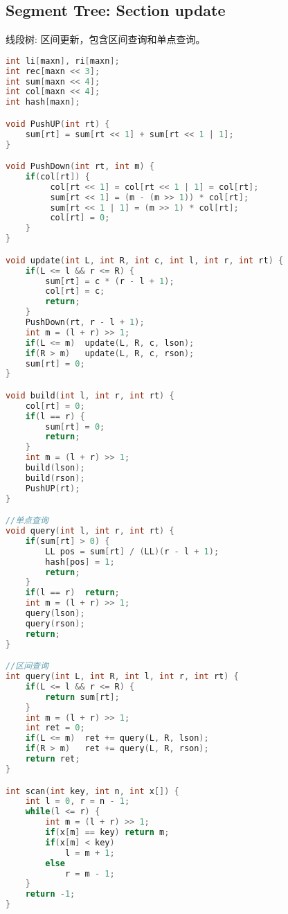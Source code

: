\subsection{Segment Tree: Section update}
    线段树: 区间更新，包含区间查询和单点查询。
    \begin{lstlisting}[language=c++]
int li[maxn], ri[maxn];
int rec[maxn << 3];
int sum[maxn << 4];
int col[maxn << 4];
int hash[maxn];

void PushUP(int rt) {
    sum[rt] = sum[rt << 1] + sum[rt << 1 | 1];
}

void PushDown(int rt, int m) {
    if(col[rt]) {
         col[rt << 1] = col[rt << 1 | 1] = col[rt];
         sum[rt << 1] = (m - (m >> 1)) * col[rt];
         sum[rt << 1 | 1] = (m >> 1) * col[rt];
         col[rt] = 0;
    }
}

void update(int L, int R, int c, int l, int r, int rt) {
    if(L <= l && r <= R) {
        sum[rt] = c * (r - l + 1);
        col[rt] = c;
        return;
    }
    PushDown(rt, r - l + 1);
    int m = (l + r) >> 1;
    if(L <= m)  update(L, R, c, lson);
    if(R > m)   update(L, R, c, rson);
    sum[rt] = 0;
}

void build(int l, int r, int rt) {
    col[rt] = 0;
    if(l == r) {
        sum[rt] = 0;
        return;
    }
    int m = (l + r) >> 1;
    build(lson);
    build(rson);
    PushUP(rt);
}

//单点查询
void query(int l, int r, int rt) { 
    if(sum[rt] > 0) {
        LL pos = sum[rt] / (LL)(r - l + 1);
        hash[pos] = 1;
        return;
    }
    if(l == r)  return;
    int m = (l + r) >> 1;
    query(lson);
    query(rson);
    return;
}

//区间查询
int query(int L, int R, int l, int r, int rt) {
    if(L <= l && r <= R) {
        return sum[rt];
    }
    int m = (l + r) >> 1;
    int ret = 0;
    if(L <= m)  ret += query(L, R, lson);
    if(R > m)   ret += query(L, R, rson);
    return ret;
}

int scan(int key, int n, int x[]) {
    int l = 0, r = n - 1;
    while(l <= r) {
        int m = (l + r) >> 1;
        if(x[m] == key) return m;
        if(x[m] < key)
            l = m + 1;
        else
            r = m - 1;
    }
    return -1;
}


\end{lstlisting}
